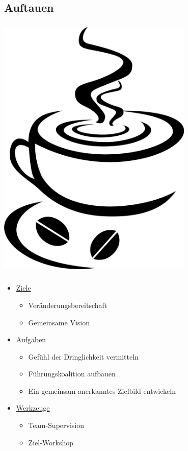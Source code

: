 \documentclass[aspectratio=169]{beamer}
\begin{document}
\subsection{Auftauen}
\begin{frame}
\frametitle{\secname}
\centering
\includegraphics[width=0.7\textwidth]{pictures/kaffetasse.jpg}

\end{frame}

\begin{frame}
\frametitle{\subsecname}\framesubtitle{\secname}
\begin{itemize}
\setlength\itemsep{1em}
\item[\color{ice-blue}\SnowflakeChevron]\underline{Ziele}
\begin{itemize}
  \item Veränderungsbereitschaft
  \item Gemeinsame Vision
\end{itemize}
\item[\color{ice-blue}\SnowflakeChevron]\underline{Aufgaben}
\begin{itemize}
  \item Gefühl der Dringlichkeit vermitteln
  \item Führungskoalition aufbauen
  \item Ein gemeinsam anerkanntes Zielbild entwickeln
\end{itemize}
\item[\color{ice-blue}\SnowflakeChevron]\underline{Werkzeuge}
\begin{itemize}
  \item Team-Supervision
  \item Ziel-Workshop
\end{itemize}
\end{itemize}
\end{frame}
\end{document}
